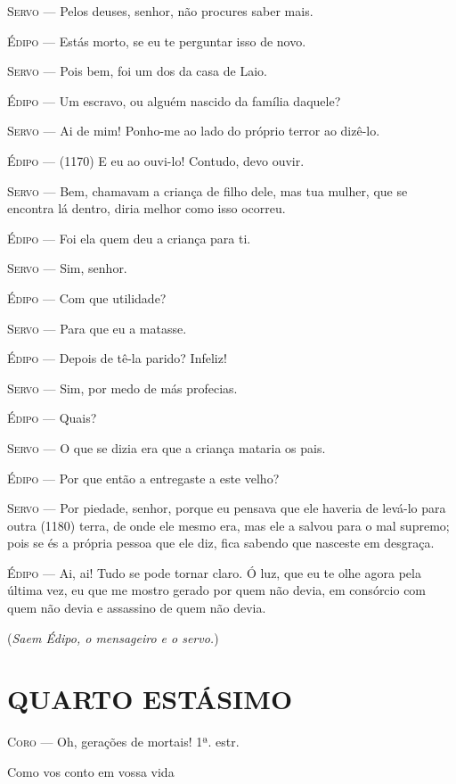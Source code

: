 \textsc{Servo} --- Pelos deuses, senhor, não procures saber mais.

\textsc{Édipo} --- Estás morto, se eu te perguntar isso de novo.

\textsc{Servo} --- Pois bem, foi um dos da casa de Laio.

\textsc{Édipo} --- Um escravo, ou alguém nascido da família daquele?

\textsc{Servo} --- Ai de mim! Ponho-me ao lado do próprio terror ao dizê-lo.

\textsc{Édipo} --- (1170) E eu ao ouvi-lo! Contudo, devo ouvir.

\textsc{Servo} --- Bem, chamavam a criança de filho dele, mas tua mulher, que se encontra
lá dentro, diria melhor como isso ocorreu.

\textsc{Édipo} --- Foi ela quem deu a criança para ti.

\textsc{Servo} --- Sim, senhor.

\textsc{Édipo} --- Com que utilidade?

\textsc{Servo} --- Para que eu a matasse.

\textsc{Édipo} --- Depois de tê-la parido? Infeliz!

\textsc{Servo} --- Sim, por medo de más profecias.

\textsc{Édipo} --- Quais?

\textsc{Servo} --- O que se dizia era que a criança mataria os pais.

\textsc{Édipo} --- Por que então a entregaste a este velho?

\textsc{Servo} --- Por piedade, senhor, porque eu pensava que ele haveria de levá-lo para
outra (1180) terra, de onde ele mesmo era, mas ele a salvou para o mal
supremo; pois se és a própria pessoa que ele diz, fica sabendo que
nasceste em desgraça.

\textsc{Édipo} --- Ai, ai! Tudo se pode tornar claro. Ó luz, que eu te olhe agora pela
última vez, eu que me mostro gerado por quem não devia, em consórcio com
quem não devia e assassino de quem não devia.

(\emph{Saem Édipo, o mensageiro e o servo.})

\section{QUARTO ESTÁSIMO}

\textsc{Coro} --- Oh, gerações de mortais! 1ª. estr.

Como vos conto em vossa vida

